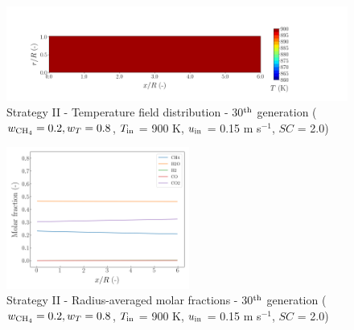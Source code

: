 \documentclass[preprint,12pt]{elsarticle}
\begin{document}
\begin{figure}[h!]
\centering
\includegraphics[width=150mm]{results/5Eq/20C_80T/GEN30-TFIELD.png}
\caption{\label{fig:5RES2080G30-TField} Strategy II - Temperature field distribution - 30$^{\rm{th}}$ generation ($w_{\rm{CH_4}} = 0.2, w_T = 0.8$, $T_{\rm{in}}$ = 900 K, $u_{\rm{in}}$ = 0.15 m s$^{-1}$, $SC$ = 2.0)}
\end{figure}

%

\begin{figure}[h!]
\centering
\includegraphics[width=60mm]{results/5Eq/20C_80T/GEN30-AVG.png}
\caption{\label{fig:5RES2080G30-avg} Strategy II - Radius-averaged molar fractions -  30$^{\rm{th}}$ generation ($w_{\rm{CH_4}} = 0.2, w_T = 0.8$, $T_{\rm{in}}$ = 900 K, $u_{\rm{in}}$ = 0.15 m s$^{-1}$, $SC$ = 2.0)}
\end{figure}
\end{document}
